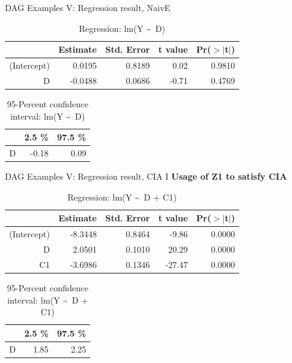 \documentclass{beamer}\usepackage[]{graphicx}\usepackage[]{color}
\begin{document}
\begin{frame}[fragile]{DAG Examples V: Regression result, NaivE}
\begin{table}[ht]
\centering
\begingroup\small
\begin{tabular}{rrrrr}
  \hline
 & Estimate & Std. Error & t value & Pr($>$$|$t$|$) \\ 
  \hline
(Intercept) & 0.0195 & 0.8189 & 0.02 & 0.9810 \\ 
  D & -0.0488 & 0.0686 & -0.71 & 0.4769 \\ 
   \hline
\end{tabular}
\endgroup
\caption{Regression: lm(Y \textasciitilde ~D)} 
\end{table}
\begin{table}[ht]
\centering
\begingroup\small
\begin{tabular}{rrr}
  \hline
 & 2.5 \% & 97.5 \% \\ 
  \hline
D & -0.18 & 0.09 \\ 
   \hline
\end{tabular}
\endgroup
\caption{95-Percent confidence interval: lm(Y \textasciitilde ~D)} 
\end{table}

\end{frame}

\begin{frame}[fragile]{DAG Examples V: Regression result, CIA I}
\textbf{Usage of Z1 to satisfy CIA}
\begin{table}[ht]
\centering
\begingroup\small
\begin{tabular}{rrrrr}
  \hline
 & Estimate & Std. Error & t value & Pr($>$$|$t$|$) \\ 
  \hline
(Intercept) & -8.3448 & 0.8464 & -9.86 & 0.0000 \\ 
  D & 2.0501 & 0.1010 & 20.29 & 0.0000 \\ 
  C1 & -3.6986 & 0.1346 & -27.47 & 0.0000 \\ 
   \hline
\end{tabular}
\endgroup
\caption{Regression: lm(Y \textasciitilde ~D + C1)} 
\end{table}
\begin{table}[ht]
\centering
\begingroup\small
\begin{tabular}{rrr}
  \hline
 & 2.5 \% & 97.5 \% \\ 
  \hline
D & 1.85 & 2.25 \\ 
   \hline
\end{tabular}
\endgroup
\caption{95-Percent confidence interval: lm(Y \textasciitilde ~D + C1)} 
\end{table}

\end{frame}
\end{document}
